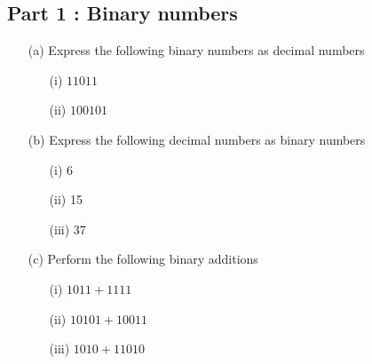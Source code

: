 \subsection*{Part 1 : Binary numbers}
\begin{itemize}
	\item[(a)] Express the following binary numbers as decimal numbers
	\begin{multicols}{2}
		\begin{itemize}
			\item[(i)] $11011$
			\item[(ii)] $100101$
		\end{itemize}
	\end{multicols}
	\item[(b)] Express the following decimal numbers as binary numbers
	\begin{multicols}{2}
		\begin{itemize}
			\item[(i)] 6
			\item[(ii)] 15
			\item[(iii)] 37
		\end{itemize}
	\end{multicols}
	\item[(c)] Perform the following binary additions
	\begin{itemize}
		\item[(i)] $1011+ 1111$
		\item[(ii)] $10101  + 10011$
		\item[(iii)] $1010 + 11010$
	\end{itemize}
	
\end{itemize}
